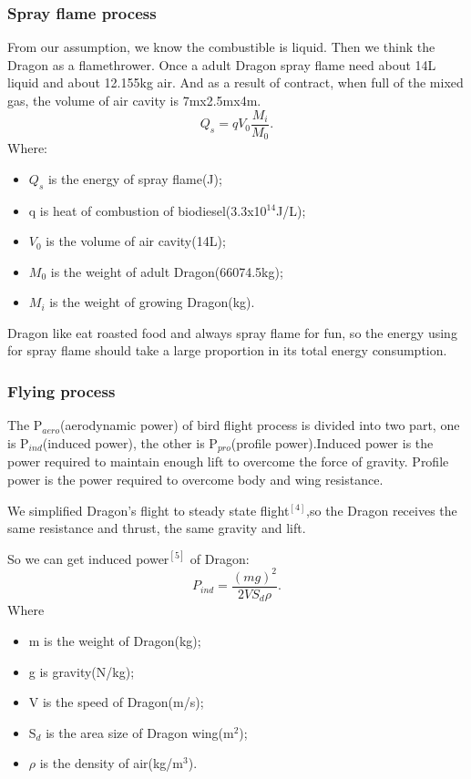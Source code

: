 \documentclass[12pt]{article}
\begin{document}
\subsubsection{Spray flame process}%
From our assumption, we know the combustible is liquid. Then we think the Dragon as a flamethrower. Once a adult Dragon spray flame need about 14L liquid and about 12.155kg air. And as a result of contract, when full of the mixed gas, the volume of air cavity is 7mx2.5mx4m.\\
\begin{equation}
	Q_s=qV_0\frac{M_i}{M_0}.	%
\end{equation}
Where:
\begin{itemize}
    \item $Q_s$ is the energy of spray flame(J);
    \item q is heat of combustion of biodiesel(3.3x10$^{14}$J/L);
    \item $V_0$ is the volume of air cavity(14L);
    \item $M_0$ is the weight of adult Dragon(66074.5kg);
    \item $M_i$ is the weight of growing Dragon(kg).
\end{itemize}
Dragon like eat roasted food and always spray flame for fun, so the energy using for spray flame should take a large proportion in its total energy consumption.

\subsubsection{Flying process}%

The P$_{aero}$(aerodynamic power) of bird flight process is divided into two part, one is P$_{ind}$(induced power), the other is P$_{pro}$(profile power).Induced power is the power required to maintain enough lift to overcome the force of gravity. Profile power is the power required to overcome body and wing resistance.

We simplified Dragon's flight to steady state flight$^{[4]}$,so the Dragon receives the same resistance and thrust, the same gravity and lift. 

So we can get induced power$^{[5]}$ of Dragon:
\begin{equation}
	P_{ind}=\frac{(mg)^2}{2VS_d\rho}.	%
\end{equation}
Where
\begin{itemize}
    \item m is the weight of Dragon(kg);
    \item g is gravity(N/kg);
    \item V is the speed of Dragon(m/s);
    \item S$_d$ is the area size of Dragon wing(m$^2$);
    \item $\rho$ is the density of air(kg/m$^3$).
\end{itemize}
\end{document}
